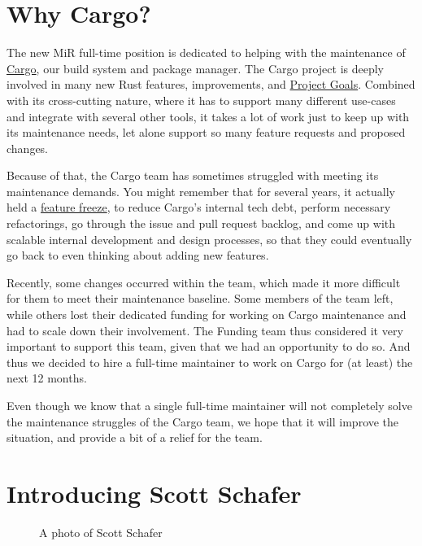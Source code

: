 \documentclass[11pt,a4paper]{article}
\begin{document}
\section{Why Cargo?}

The new MiR full-time position is dedicated to helping with the maintenance of \href{https://github.com/rust-lang/cargo}{Cargo}, our build system and package manager. The Cargo project is deeply involved in many new Rust features, improvements, and \href{https://goals.rust-lang.org/2026/goals.html\#cargo-team}{Project Goals}. Combined with its cross-cutting nature, where it has to support many different use-cases and integrate with several other tools, it takes a lot of work just to keep up with its maintenance needs, let alone support so many feature requests and proposed changes.

Because of that, the Cargo team has sometimes struggled with meeting its maintenance demands. You might remember that for several years, it actually held a \href{https://blog.rust-lang.org/inside-rust/2022/03/31/cargo-team-changes/}{feature freeze}, to reduce Cargo's internal tech debt, perform necessary refactorings, go through the issue and pull request backlog, and come up with scalable internal development and design processes, so that they could eventually go back to even thinking about adding new features.

Recently, some changes occurred within the team, which made it more difficult for them to meet their maintenance baseline. Some members of the team left, while others lost their dedicated funding for working on Cargo maintenance and had to scale down their involvement. The Funding team thus considered it very important to support this team, given that we had an opportunity to do so. And thus we decided to hire a full-time maintainer to work on Cargo for (at least) the next 12 months.

Even though we know that a single full-time maintainer will not completely solve the maintenance struggles of the Cargo team, we hope that it will improve the situation, and provide a bit of a relief for the team.

\section{Introducing Scott Schafer}

\begin{figure}[h]
\caption{A photo of Scott Schafer}
\end{figure}
\end{document}
